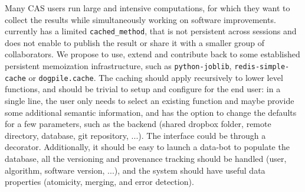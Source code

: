 \begin{workpackage}[id=dksbases,wphases=1-48!.5,
  title=Data/Knowledge/Software-Bases,lead=JU,
  ZHRM=12,JURM=36,USHRM=12,UWRM=3,SARM=9]
\begin{tasklist}
\begin{task}[title=Memoization and production of new data,id=data-memo]
Many CAS users run large and intensive computations, for which they want to collect the results while simultaneously working on software improvements. \Sage currently has a limited \lstinline{cached_method}, that is not persistent across sessions and does not enable to publish the result or share it with a smaller group of collaborators. We propose to use, extend and contribute back to some established persistent memoization infrastructure, such as \texttt{python-joblib}, \texttt{redis-simple-cache} or \texttt{dogpile.cache}. The caching should apply recursively to lower level functions, and should be trivial to setup and configure for the end user: in a single line, the user only needs to select an existing function and maybe provide some additional semantic information, and has the option to change the defaults for a few parameters, such as the backend (shared dropbox folder, remote directory, database, git repository, ...). The interface could be through a \Python decorator. 
Additionally, it should be easy to launch a data-bot to populate the database, all the versioning and provenance tracking should be handled (user, algorithm, software version, ...), and the system should have useful data properties (atomicity, merging, and error detection). 
\end{task}
\end{tasklist}


\end{workpackage}

